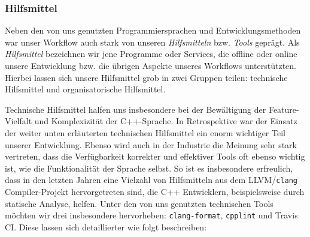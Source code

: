 
\subsubsection{Hilfsmittel}
\label{team:orga-workflow-tools}

Neben den von uns genutzten Programmiersprachen und Entwicklungsmethoden war
unser Workflow auch stark von unseren \emph{Hilfsmitteln} bzw. \emph{Tools}
geprägt. Als \emph{Hilfsmittel} bezeichnen wir jene Programme oder Services, die
offline oder online unsere Entwicklung bzw. die übrigen Aspekte unseres
Workflows unterstützten. Hierbei lassen sich unsere Hilfsmittel grob in zwei
Gruppen teilen: technische Hilfsmittel und organisatorische Hilfsmittel.

Technische Hilfsmittel halfen uns insbesondere bei der Bewältigung der
Feature-Vielfalt und Komplexizität der C++-Sprache. In Retrospektive war der
Einsatz der weiter unten erläuterten technischen Hilfsmittel ein enorm wichtiger
Teil unserer Entwicklung. Ebenso wird auch in der Industrie die Meinung sehr
stark vertreten, dass die Verfügbarkeit korrekter und effektiver Tools oft
ebenso wichtig ist, wie die Funktionalität der Sprache selbst. So ist es
insbesondere erfreulich, dass in den letzten Jahren eine Vielzahl von
Hilfsmitteln aus dem LLVM/\texttt{clang} Compiler-Projekt hervorgetreten sind,
die C++ Entwicklern, beispielsweise durch statische Analyse, helfen. Unter den
von uns genutzten technischen Tools möchten wir drei insbesondere hervorheben:
\texttt{clang-format}, \texttt{cpplint} und Travis CI. Diese lassen sich
detaillierter wie folgt beschreiben:

